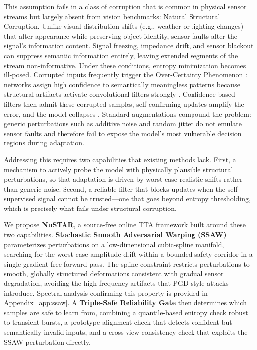\documentclass[sigconf, screen, review, anonymous]{acmart}
\theoremstyle{plain}
\theoremstyle{definition}
\theoremstyle{remark}
\begin{document}
This assumption fails in a class of corruption that is common in physical
sensor streams but largely absent from vision benchmarks: Natural Structural
Corruption. Unlike visual distribution shifts (e.g., weather or lighting
changes) that alter appearance while preserving object identity, sensor
faults alter the signal's information content. Signal freezing, impedance
drift, and sensor blackout \citep{lai2021revisiting, darban2023deep} can
suppress semantic information entirely, leaving extended segments of the
stream non-informative. Under these conditions, entropy minimization becomes
ill-posed. Corrupted inputs frequently trigger the Over-Certainty
Phenomenon \citep{amin2025overcertaintyphenomenonmoderntesttime}: networks
assign high confidence to semantically meaningless patterns because
structural artifacts activate convolutional filters strongly
\citep{nguyen2015deepneuralnetworkseasily}. Confidence-based filters then
admit these corrupted samples, self-confirming updates amplify the error,
and the model collapses \citep{gong2023sotta}. Standard augmentations
compound the problem: generic perturbations such as additive noise and
random jitter do not emulate sensor faults and therefore fail to expose
the model's most vulnerable decision regions during adaptation.

Addressing this requires two capabilities that existing methods lack.
First, a mechanism to actively probe the model with physically plausible
structural perturbations, so that adaptation is driven by worst-case
realistic shifts rather than generic noise. Second, a reliable filter that
blocks updates when the self-supervised signal cannot be trusted---one that
goes beyond entropy thresholding, which is precisely what fails under
structural corruption.

We propose \textbf{NuSTAR}, a source-free online TTA framework built
around these two capabilities. \textbf{Stochastic Smooth Adversarial Warping (SSAW)} parameterizes perturbations on a low-dimensional
cubic-spline manifold, searching for the worst-case amplitude drift within
a bounded safety corridor in a single gradient-free forward pass. The
spline constraint restricts perturbations to smooth, globally structured
deformations consistent with gradual sensor degradation, avoiding the
high-frequency artifacts that PGD-style attacks introduce. Spectral analysis
confirming this property is provided in Appendix~\ref{app:ssaw}.
A \textbf{Triple-Safe Reliability Gate} then determines which samples are
safe to learn from, combining a quantile-based entropy check robust to
transient bursts, a prototype alignment check that detects confident-but-
semantically-invalid inputs, and a cross-view consistency check that
exploits the SSAW perturbation directly.
\end{document}
